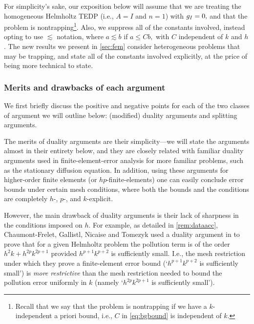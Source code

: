 For simplicity's sake, our exposition below will assume that we are treating the homogeneous Helmholtz TEDP (i.e., $A=I$ and $n=1$) with $g_{I} = 0,$ and that the problem is nontrapping\footnote{Recall that we say that the problem is nontrapping if we have a $k$-independent a priori bound, i.e., $C$ in \cref{eq:bgbound} is independent of $k.$}. Also, we suppress all of the constants involved, instead opting to use $\lesssim$ notation, where $a \lesssim b$ if $a \leq C b,$ with $C$ independent of $k$ and $h$. The new results we present in \cref{sec:fem} consider heterogeneous problems that may be trapping, and state all of the constants involved explicitly, at the price of being more technical to state.

\subsubsection{Merits and drawbacks of each argument}
We first briefly discuss the positive and negative points for each of the two classes of argument we will outline below: (modified) duality arguments and splitting arguments.

The merits of duality arguments are their simplicity---we will state the arguments almost in their entirety below, and they are closely related with familiar duality arguments used in finite-element-error analysis for more familiar problems, such as the stationary diffusion equation. In addition, using these arguments for higher-order finite elements (or $hp$-finite-elements) one can easily conclude error bounds under certain mesh conditions, where both the bounds and the conditions are completely $h$-, $p$-, and $k$-explicit.%

However, the main drawback of duality arguments is their lack of sharpness in the conditions imposed on $h$. For example, as detailed in \cref{rem:dataacc}, Chaumont-Frelet, Gallistl, Nicaise and Tomezyk used a duality argument in \cite{ChGaNiTo:18} to prove that for a given Helmholtz problem the pollution term is of the order $h^2k + h^{2p}k^{2p+1}$ provided $h^{p+1}k^{p+2}$ is sufficiently small. I.e., the mesh restriction under which they prove a finite-element error bound (`$h^{p+1}k^{p+2}$ is sufficiently small') is \emph{more restrictive} than the mesh restriction needed to bound the pollution error uniformly in $k$ (namely `$h^{2p}k^{2p+1}$ is sufficiently small').

